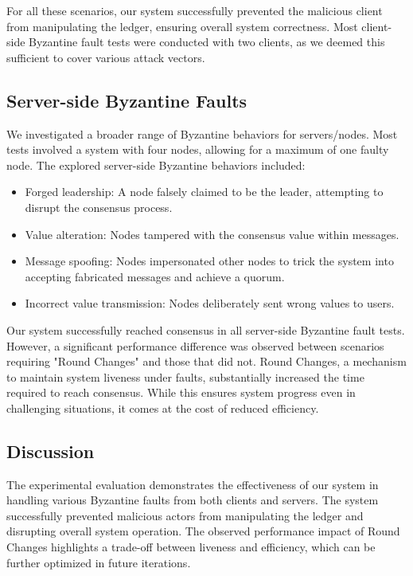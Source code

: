 For all these scenarios, our system successfully prevented the malicious client from manipulating the ledger, ensuring overall system correctness. Most client-side Byzantine fault tests were conducted with two clients, as we deemed this sufficient to cover various attack vectors.

\subsection{Server-side Byzantine Faults} We investigated a broader range of Byzantine behaviors for servers/nodes. Most tests involved a system with four nodes, allowing for a maximum of one faulty node. The explored server-side Byzantine behaviors included:
    \begin{itemize}
        \item Forged leadership: A node falsely claimed to be the leader, attempting to disrupt the consensus process.
        \item Value alteration: Nodes tampered with the consensus value within messages.
        \item Message spoofing: Nodes impersonated other nodes to trick the system into accepting fabricated messages and achieve a quorum.
        \item Incorrect value transmission: Nodes deliberately sent wrong values to users.
    \end{itemize}

Our system successfully reached consensus in all server-side Byzantine fault tests. However, a significant performance difference was observed between scenarios requiring "Round Changes" and those that did not. Round Changes, a mechanism to maintain system liveness under faults, substantially increased the time required to reach consensus. While this ensures system progress even in challenging situations, it comes at the cost of reduced efficiency.

\subsection{Discussion}

The experimental evaluation demonstrates the effectiveness of our system in handling various Byzantine faults from both clients and servers. The system successfully prevented malicious actors from manipulating the ledger and disrupting overall system operation. The observed performance impact of Round Changes highlights a trade-off between liveness and efficiency, which can be further optimized in future iterations.






